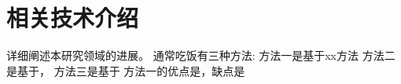 \section{相关技术介绍}

详细阐述本研究领域的进展。
通常吃饭有三种方法:
方法一是基于xx方法\cite{lu2012analysis}
方法二是基于，
方法三是基于
方法一的优点是，缺点是